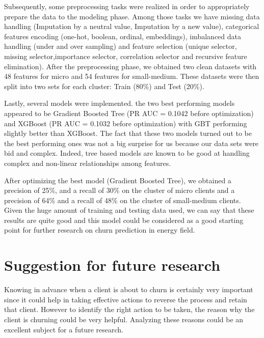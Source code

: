 \documentclass[LaM,binding=0.6cm, english]{sapthesis}
\begin{document}
Subsequently, some preprocessing tasks were realized in order to appropriately prepare the data to the modeling phase. Among those tasks we have missing data handling (Imputation by a neutral value, Imputation by a new value), categorical features encoding (one-hot, boolean, ordinal, embeddings), imbalanced data handling (under and over sampling) and feature selection (unique selector, missing selector,importance selector, correlation selector and recursive feature elimination). After the preprocessing phase, we obtained two clean datasets with 48 features for micro and 54 features for small-medium. These datasets were then split into two sets for each cluster: Train (80\%) and Test (20\%).

Lastly, several models were implemented. the two best performing models appeared to be Gradient Boosted Tree (PR AUC = 0.1042 before optimization) and XGBoost (PR AUC = 0.1032 before optimization) with GBT performing slightly better than XGBoost. The fact that these two models turned out to be the best performing ones was not a big surprise for us because our data sets were bid and complex. Indeed, tree based models are known to be good at handling complex and non-linear relationships among features.

After optimizing the best model (Gradient Boosted Tree), we obtained a precision of 25\%, and a recall of 30\% on the cluster of micro clients and a precision of 64\% and a recall of 48\% on the cluster of small-medium clients. Given the huge amount of training and testing data used, we can say that these results are quite good and this model could be considered as a good starting point for further research on churn prediction in energy field.

\section{Suggestion for future research}

Knowing in advance when a client is about to churn is certainly very important since it could help in taking effective actions to reverse the process and retain that client. However to identify the right action to be taken, the reason why the client is churning could be very helpful. Analyzing these reasons could be an excellent subject for a future research.

\backmatter
\end{document}
